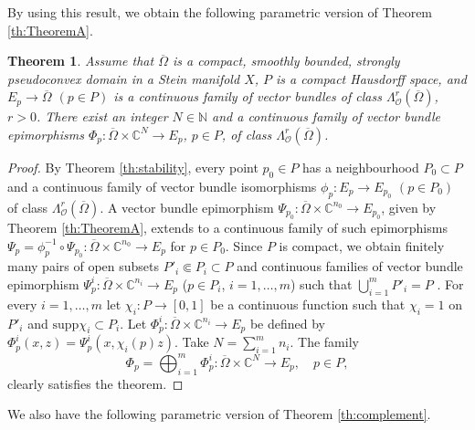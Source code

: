 \documentclass[11pt]{amsart}
\numberwithin{equation}{section}
\newtheorem{theorem}{Theorem}[section]
\theoremstyle{definition}
\newcommand\Oscr{\mathscr{O}}
\newcommand\C{\mathbb{C}}
\newcommand\N{\mathbb{N}}
\newcommand\supp{\mathrm{supp}}
\begin{document}
%
%
By using this result, we obtain the following parametric version of Theorem \ref{th:TheoremA}. 

\begin{theorem}
\label{th:TheoremApar}
Assume that $\overline \Omega$ is a compact, smoothly bounded, 
strongly pseudoconvex domain in a Stein manifold $X$,  
$P$ is a compact Hausdorff space, 
and $E_p\to \overline \Omega$ $(p\in P)$ is a continuous
family of vector bundles of class 
$\Lambda^r_\Oscr(\overline\Omega)$, $r>0$. 
There exist an integer $N\in \N$ and a 
continuous family of vector bundle epimorphisms
$\Phi_p: \overline \Omega\times \C^N \to E_p$, $p\in P$,
of class $\Lambda^r_\Oscr(\overline \Omega)$.
\end{theorem}

\begin{proof}
By Theorem \ref{th:stability}, every point 
$p_0\in P$ has a neighbourhood $P_0\subset P$ and a continuous 
family of vector bundle isomorphisms $\phi_p:E_p\to E_{p_0}$ 
$(p\in P_0)$ of class $\Lambda^r_\Oscr(\overline\Omega)$.
A vector bundle epimorphism
$\Psi_{p_0}: \overline \Omega\times \C^{n_0} \to E_{p_0}$,
given by Theorem \ref{th:TheoremA}, extends to a continuous
family of such epimorphisms $\Psi_p=\phi_p^{-1}\circ \Psi_{p_0}:
\overline \Omega\times \C^{n_0} \to E_{p}$ for $p\in P_0$.
Since $P$ is compact, we obtain finitely many pairs of open 
subsets $P'_i \Subset P_i\subset P$ and 
continuous families of vector bundle 
epimorphism $\Psi^i_p:\overline \Omega\times \C^{n_i}\to E_p$ 
($p\in P_i$,  $i=1,\ldots,m$) such that $\bigcup_{i=1}^m P'_i=P$ .
For every $i=1,\ldots,m$ let $\chi_i:P\to [0,1]$ be a continuous
function such that $\chi_i=1$ on $P'_i$ and $\supp \chi_i\subset P_i$.
Let $\Phi^i_p: \overline \Omega\times \C^{n_i}\to E_p$ be 
defined by $\Phi^i_p(x,z)= \Psi^i_p(x,\chi_i(p)z)$. 
Take $N=\sum_{i=1}^m n_i$. The family 
\[
	\Phi_p=\bigoplus_{i=1}^m \Phi^i_p: 
	\overline \Omega\times \C^{N}\to E_p,
	\quad p\in P,
\]
clearly satisfies the theorem.
\end{proof}


%
%
We also have the following parametric version of 
Theorem \ref{th:complement}.
\end{document}
